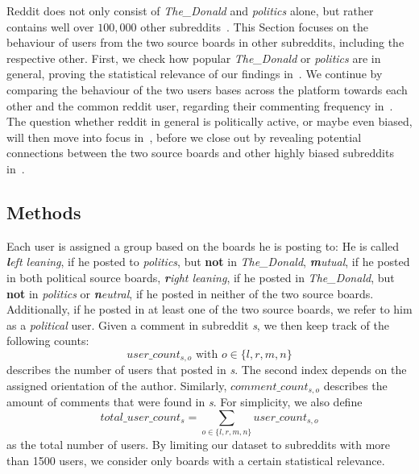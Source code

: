\documentclass[runningheads,a4paper]{llncs}
\begin{document}
	Reddit does not only consist of \textit{The\_Donald} and \textit{politics} alone, but rather contains well over $100,000$ other subreddits~\cite{reddit-about}. This Section focuses on the behaviour of users from the two source boards in other subreddits, including the respective other. First, we check how popular \textit{The\_Donald} or \textit{politics} are in general, proving the statistical relevance of our findings in~. We continue by comparing the behaviour
	of the two users bases across the platform towards each other and the common reddit user, regarding their commenting frequency in~.
	The question whether reddit in general is politically active, or maybe even biased, will then move into focus in~, before we close out by revealing potential connections between the two source boards and other highly biased subreddits in~.
	
	\subsection{Methods}\label{sub:cross_subreddit_motivation}
	
	Each user is assigned a group based on the boards he is posting to:
	He is called \textit{\textbf{l}eft leaning}, if he posted to \textit{politics}, but \textbf{not} in \textit{The\_Donald}, \textit{\textbf{m}utual}, if he posted in both political source boards, \textit{\textbf{r}ight leaning}, if he posted in \textit{The\_Donald}, but \textbf{not} in \textit{politics} or \textit{\textbf{n}eutral}, if he posted in neither of the two source boards.
	Additionally, if he posted in at least one of the two source boards, we refer to him as a \textit{political} user. Given a comment in subreddit \textit{s}, we then keep track of the following counts:
	$$user\_count_{s,o} \text{ with } o \in \{l,r,m,n\}$$
	describes the number of users that posted in \textit{s}. The second index depends on the assigned orientation of the author.
	Similarly, $comment\_count_{s,o}$ describes the amount of comments that were found in \textit{s}.
	For simplicity, we also define
	$$total\_user\_count_{s} = \sum_{o \in \{l,r,m,n\}} user\_count_{s,o}$$
	as the total number of users. By limiting our dataset to subreddits with more than 1500 users, we consider only boards with a certain statistical relevance.
	
\end{document}
